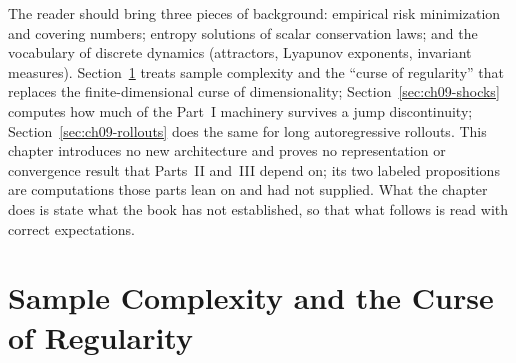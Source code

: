 The reader should bring three pieces of background: empirical risk
minimization and covering numbers; entropy solutions of scalar conservation
laws; and the vocabulary of discrete dynamics (attractors, Lyapunov exponents,
invariant
measures). Section~\ref{sec:ch09-sample-complexity} treats sample complexity and
the ``curse of regularity'' that replaces the finite-dimensional curse of
dimensionality; Section~\ref{sec:ch09-shocks} computes how much of the
Part~I machinery survives a jump discontinuity; Section~\ref{sec:ch09-rollouts}
does the same for long autoregressive rollouts. This chapter introduces no new
architecture and proves no representation or convergence result that
Parts~II and~III depend on; its two labeled propositions are computations those
parts lean on and had not supplied. What the chapter does is state
what the book has not established, so that what follows is read with correct
expectations.

\section{Sample Complexity and the Curse of Regularity}
\label{sec:ch09-sample-complexity}


